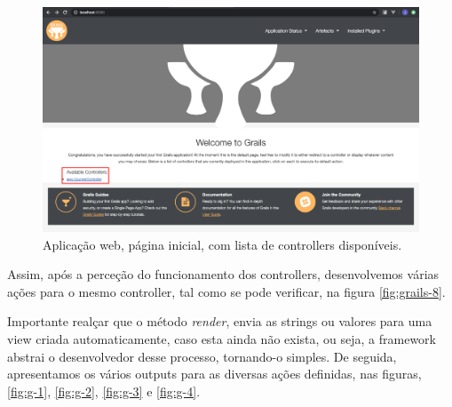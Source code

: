 \begin{figure}[H]
    \centering
    \includegraphics[scale=0.30]{images/grails-7.png}
    \caption{Aplicação web, página inicial, com lista de controllers disponíveis.}
    \label{fig:grails-7}
\end{figure}

\hspace{5mm} Assim, após a perceção do funcionamento dos controllers, desenvolvemos várias ações para o mesmo controller, tal como se pode verificar, na figura \ref{fig:grails-8}.

\hspace{5mm} Importante realçar que o método \textit{render}, envia as strings ou valores para uma view criada automaticamente, caso esta ainda não exista, ou seja, a framework abstrai o desenvolvedor desse processo, tornando-o simples. De seguida, apresentamos os vários outputs para as diversas ações definidas, nas figuras, \ref{fig:g-1}, \ref{fig:g-2}, \ref{fig:g-3} e \ref{fig:g-4}.


